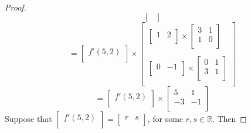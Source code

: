 \documentclass{article}
\theoremstyle{plain} %
\numberwithin{thm}{section} %
\theoremstyle{definition}
\begin{document}
\begin{proof}
\[\begin{bmatrix}
                \end{bmatrix}
            \]
            \[
                = \begin{bmatrix}
                    f'(5,2) \\
                \end{bmatrix}
                \times 
                \begin{bmatrix}
                    \begin{bmatrix}
                        1 & 2 \\
                    \end{bmatrix}
                    \times 
                    \begin{bmatrix}
                        3 & 1 \\
                        1 & 0 \\
                    \end{bmatrix} \\
                    \\
                \begin{bmatrix}
                    0 & -1 \\
                \end{bmatrix}
                \times 
                \begin{bmatrix}
                        0 & 1 \\
                        3 & 1 \\
                \end{bmatrix} \\
            \end{bmatrix}
            \]
            \[
                = \begin{bmatrix}
                    f'(5,2) \\
            \end{bmatrix}
            \times 
            \begin{bmatrix}
                5  & 1 \\
                -3  & -1 \\
            \end{bmatrix}
            \]
            Suppose that \(\begin{bmatrix}
                f'(5,2) \\
            \end{bmatrix} = \begin{bmatrix}
                r  &  s \\
            \end{bmatrix}\), for some \(r,s \in \mathbb{R}\). Then

\end{proof}
\end{document}
